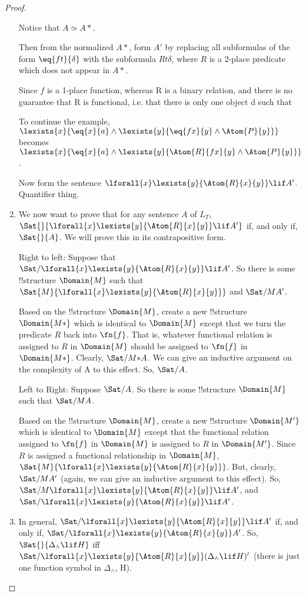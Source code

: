 \documentclass[../../include/open-logic-section]{subfiles}
\begin{document}
\begin{proof}
\begin{enumerate}
Notice that $ A \simeq A*$.

Then from the normalized $A*$, form $A'$ by replacing all subformulas of
the form $\eq{ft}{\delta}$ with the subformula $R{t}{\delta}$, where $R$ is
a 2-place predicate which does not appear in $A*$.

Since $f$ is a 1-place function, whereas R is a binary relation, and there
is no guarantee that R is functional, i.e. that there is only one object d
such that

To continue the example, $\lexists{x}{\eq{x}{a} \land
\lexists{y}{\eq{fx}{y} \land \Atom{P}{y}}}$ becomes $\lexists{x}{\eq{x}{a}
\land \lexists{y}{\Atom{R}{fx}{y} \land \Atom{P}{y}}}$.

Now form the sentence $\lforall{x}\lexists{y}{\Atom{R}{x}{y}}\lif A'$.
Quantifier thing.

\item We now want to prove that for any sentence $A$ of $L_T$,
$\Sat{}{\lforall{x}\lexists{y}{\Atom{R}{x}{y}}\lif A'}$ if, and only if,
$\Sat{}{A}$. We will prove this in its contrapositive form.

Right to left: Suppose that
$\Sat/{}{\lforall{x}\lexists{y}{\Atom{R}{x}{y}}\lif A'}$. So there is some
!!{structure} $\Domain{M}$ such that
$\Sat{M}{\lforall{x}\lexists{y}{\Atom{R}{x}{y}}}$ and $\Sat/{M}{A'}$.

Based on the !!{structure} $\Domain{M}$, create a new !!{structure}
$\Domain{M*}$ which is identical to $\Domain{M}$ except that we turn the
predicate $R$ back into $\fn{f}$. That is, whatever functional relation is
assigned to $R$ in $\Domain{M}$ should be assigned to $\fn{f}$ in
$\Domain{M*}$. Clearly, $\Sat/{M*}{A}$. We can give an inductive argument
on the complexity of A to this effect. So, $\Sat/{}{A}$.

Left to Right: Suppose $\Sat/{}{A}$. So there is some !!{structure}
$\Domain{M}$ such that $\Sat/{M}{A}$.

Based on the !!{structure} $\Domain{M}$, create a new !!{structure}
$\Domain{M'}$ which is identical to $\Domain{M}$ except that the functional
relation assigned to $\fn{f}$ in $\Domain{M}$ is assigned to $R$ in
$\Domain{M'}$. Since $R$ is assigned a functional relationship in
$\Domain{M}$, $\Sat{M}{\lforall{x}\lexists{y}{\Atom{R}{x}{y}}}$. But,
clearly, $\Sat/{M}{A'}$ (again, we can give an inductive argument to this
effect). So, $\Sat/{M}{\lforall{x}\lexists{y}{\Atom{R}{x}{y}}\lif A'}$, and
$\Sat/{}{\lforall{x}\lexists{y}{\Atom{R}{x}{y}}\lif A'}$.

\item In general, $\Sat/{}{\lforall{x}\lexists{y}{\Atom{R}{x}{y}}\lif A'}$
if, and only if, $\Sat/{\lforall{x}\lexists{y}{\Atom{R}{x}{y}}}{A'}$. So,
$\Sat{}{\Delta_\land \lif H}$ iff
$\Sat/{\lforall{x}\lexists{y}{\Atom{R}{x}{y}}}{(\Delta_\land \lif H)'}$
(there is just one function symbol in $\Delta_\land$, H).


\end{enumerate}
\end{proof}
\end{document}
